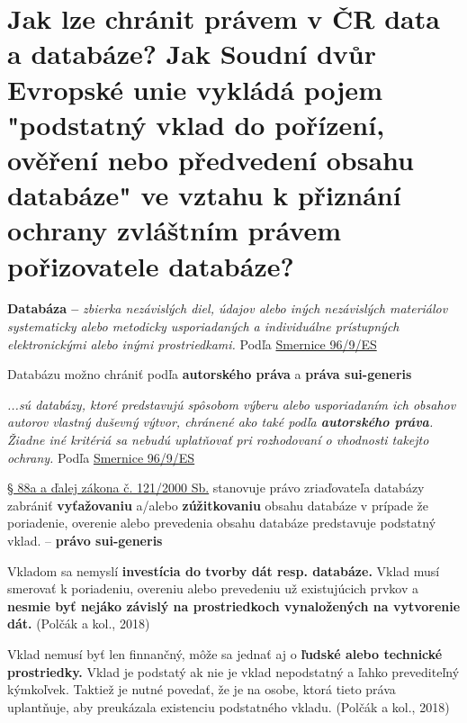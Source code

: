\section{Jak lze chránit právem v ČR data a databáze? Jak Soudní dvůr Evropské unie vykládá pojem "podstatný vklad do pořízení, ověření nebo předvedení obsahu databáze" ve vztahu k přiznání ochrany zvláštním právem pořizovatele databáze?}

\textbf{Databáza \--- }\textit{zbierka nezávislých diel, údajov alebo iných nezávislých materiálov systematicky alebo metodicky usporiadaných a individuálne prístupných elektronickými alebo inými prostriedkami.} Podľa \href{https://eur-lex.europa.eu/legal-content/SK/ALL/?uri=celex:31996L0009}{Smernice 96/9/ES}

Databázu možno chrániť podľa \textbf{autorského práva} a \textbf{práva sui-generis}

\textit{...sú databázy, ktoré predstavujú spôsobom výberu alebo usporiadaním ich obsahov
autorov vlastný duševný výtvor, chránené ako také podľa
\textbf{autorského práva}. Žiadne iné kritériá sa nebudú uplatňovať
pri rozhodovaní o vhodnosti takejto ochrany.} Podľa \href{https://eur-lex.europa.eu/legal-content/SK/ALL/?uri=celex:31996L0009}{Smernice 96/9/ES}

\href{https://www.zakonyprolidi.cz/cs/2000-121#:~:text=zvlastni%20prava%20k%20databazi%20(%C2%A7%2090)%20prislusi%20porizovateli%20databaze%2C%20pokud%20porizeni%2C%20overeni%20nebo%20predvedeni%20obsahu%20databaze%20predstavuje%20kvalitativne%20nebo%20kvantitativne%20podstatny%20vklad%20bez%20ohledu%20na%20to%2C%20zda%20databaze%20nebo%20jeji%20obsah%20jsou%20predmetem%20autorskopravni%20nebo%20jine%20ochrany.}{§ 88a a ďalej zákona č. 121/2000 Sb.} stanovuje právo zriaďovateľa databázy zabrániť \textbf{vyťažovaniu} a/alebo \textbf{zúžitkovaniu} obsahu databáze v prípade že poriadenie, overenie alebo prevedenia obsahu databáze predstavuje podstatný vklad. \--- \textbf{právo sui-generis}

Vkladom sa nemyslí \textbf{investícia do tvorby dát resp. databáze.} Vklad musí smerovať k poriadeniu, overeniu alebo prevedeniu už existujúcich prvkov a \textbf{nesmie byť nejáko závislý na prostriedkoch vynaložených na vytvorenie dát.} (Polčák a kol., 2018)

Vklad nemusí byť len finnančný, môže sa jednať aj o \textbf{ľudské alebo technické prostriedky.} Vklad je podstatý ak nie je vklad nepodstatný a ľahko prevediteľný kýmkoľvek. Taktiež je nutné povedať, že je na osobe, ktorá tieto práva uplantňuje, aby preukázala existenciu podstatného vkladu. (Polčák a kol., 2018)

